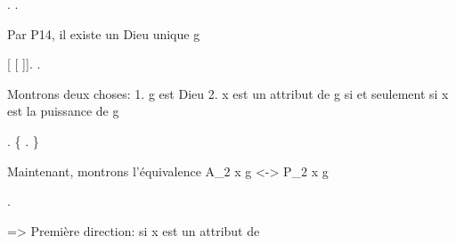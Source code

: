 \documentclass[10pt]{report}
\begin{document}
\begin{coqdoccode}
\coqdocnoindent
{}.\coqdoceol
\coqdocindent{1.00em}
 .\coqdoceol
\coqdocemptyline
\coqdocindent{1.00em}
\begin{coqdoccomment}
\coqdocindent{0.50em}
Par\coqdocindent{0.50em}
P14,\coqdocindent{0.50em}
il\coqdocindent{0.50em}
existe\coqdocindent{0.50em}
un\coqdocindent{0.50em}
Dieu\coqdocindent{0.50em}
unique\coqdocindent{0.50em}
g\coqdocindent{0.50em}
\end{coqdoccomment}
\coqdoceol
\coqdocindent{1.00em}
   [ [ ]].\coqdoceol
\coqdocindent{1.00em}
\coqdoctac{\ensuremath{\exists}} .\coqdoceol
\coqdocemptyline
\coqdocindent{1.00em}
\begin{coqdoccomment}
\coqdocindent{0.50em}
Montrons\coqdocindent{0.50em}
deux\coqdocindent{0.50em}
choses:\coqdoceol
\coqdocindent{2.50em}
1.\coqdocindent{0.50em}
g\coqdocindent{0.50em}
est\coqdocindent{0.50em}
Dieu\coqdoceol
\coqdocindent{2.50em}
2.\coqdocindent{0.50em}
x\coqdocindent{0.50em}
est\coqdocindent{0.50em}
un\coqdocindent{0.50em}
attribut\coqdocindent{0.50em}
de\coqdocindent{0.50em}
g\coqdocindent{0.50em}
si\coqdocindent{0.50em}
et\coqdocindent{0.50em}
seulement\coqdocindent{0.50em}
si\coqdocindent{0.50em}
x\coqdocindent{0.50em}
est\coqdocindent{0.50em}
la\coqdocindent{0.50em}
puissance\coqdocindent{0.50em}
de\coqdocindent{0.50em}
g\coqdocindent{0.50em}
\end{coqdoccomment}
\coqdoceol
\coqdocemptyline
\coqdocindent{1.00em}
.\coqdoceol
\coqdocindent{1.00em}
\{  . \}\coqdoceol
\coqdocindent{1.00em}
\coqdoceol
\coqdocindent{1.00em}
\begin{coqdoccomment}
\coqdocindent{0.50em}
Maintenant,\coqdocindent{0.50em}
montrons\coqdocindent{0.50em}
l'équivalence\coqdocindent{0.50em}
A\_2\coqdocindent{0.50em}
x\coqdocindent{0.50em}
g\coqdocindent{0.50em}
<->\coqdocindent{0.50em}
P\_2\coqdocindent{0.50em}
x\coqdocindent{0.50em}
g\coqdocindent{0.50em}
\end{coqdoccomment}
\coqdoceol
\coqdocindent{1.00em}
.\coqdoceol
\coqdocemptyline
\coqdocindent{1.00em}
\begin{coqdoccomment}
\coqdocindent{0.50em}
=>\coqdocindent{0.50em}
Première\coqdocindent{0.50em}
direction:\coqdocindent{0.50em}
si\coqdocindent{0.50em}
x\coqdocindent{0.50em}
est\coqdocindent{0.50em}
un\coqdocindent{0.50em}
attribut\coqdocindent{0.50em}
de\coqdocindent{0.50em}

\end{coqdoccomment}
\end{coqdoccode}
\end{document}
